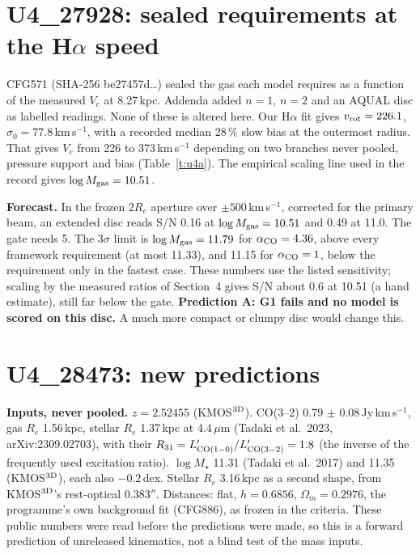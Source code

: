 \documentclass[10pt]{article}
\begin{document}
\section{U4\_27928: sealed requirements at the \texorpdfstring{H$\alpha$}{H-alpha} speed}
CFG571 (SHA-256 be27457d\ldots) sealed the gas each model requires as a function of the measured $V_c$ at 8.27\,kpc. Addenda added $n=1$, $n=2$ and an AQUAL disc as labelled readings. None of these is altered here. Our H$\alpha$ fit gives $v_{\rm rot}=226.1$, $\sigma_0=77.8$\,km\,s$^{-1}$, with a recorded median 28\,\% slow bias at the outermost radius. That gives $V_c$ from 226 to 373\,km\,s$^{-1}$ depending on two branches never pooled, pressure support and bias (Table~\ref{t:u4a}). The empirical scaling line used in the record gives $\log M_{\rm gas}=10.51$.



\textbf{Forecast.} In the frozen 2$R_e$ aperture over $\pm500$\,km\,s$^{-1}$, corrected for the primary beam, an extended disc reads S/N 0.16 at $\log M_{\rm gas}=10.51$ and 0.49 at 11.0. The gate needs 5. The 3$\sigma$ limit is $\log M_{\rm gas}=11.79$ for $\alpha_{\rm CO}=4.36$, above every framework requirement (at most 11.33), and 11.15 for $\alpha_{\rm CO}=1$, below the requirement only in the fastest case. These numbers use the listed sensitivity; scaling by the measured ratios of Section~4 gives S/N about 0.6 at 10.51 (a hand estimate), still far below the gate. \textbf{Prediction A: G1 fails and no model is scored on this disc.} A much more compact or clumpy disc would change this.

\section{U4\_28473: new predictions}
\textbf{Inputs, never pooled.} $z=2.52455$ (KMOS$^{\rm 3D}$). CO(3--2) 0.79 $\pm$ 0.08\,Jy\,km\,s$^{-1}$, gas $R_e$ 1.56\,kpc, stellar $R_e$ 1.37\,kpc at 4.4\,$\mu$m (Tadaki et al.\ 2023, arXiv:2309.02703), with their $R_{31}=L'_{\rm CO(1-0)}/L'_{\rm CO(3-2)}=1.8$ (the inverse of the frequently used excitation ratio). $\log M_\star$ 11.31 (Tadaki et al.\ 2017) and 11.35 (KMOS$^{\rm 3D}$), each also $-0.2$\,dex. Stellar $R_e$ 3.16\,kpc as a second shape, from KMOS$^{\rm 3D}$'s rest-optical 0.383$''$. Distances: flat, $h=0.6856$, $\Omega_m=0.2976$, the programme's own background fit (CFG886), as frozen in the criteria. These public numbers were read before the predictions were made, so this is a forward prediction of unreleased kinematics, not a blind test of the mass inputs.
\end{document}

